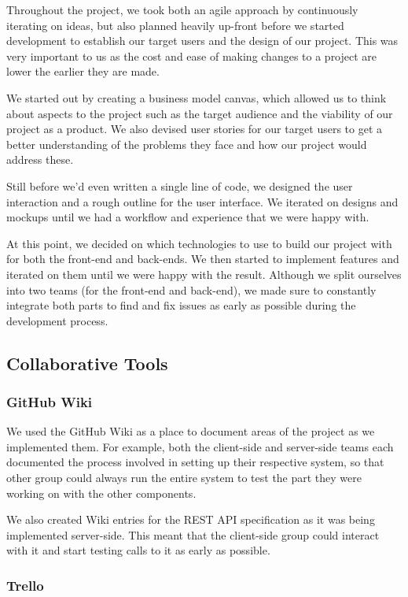 \documentclass[11pt]{article}
\begin{document}
Throughout the project, we took both an agile approach by continuously iterating on ideas, but also planned heavily up-front before we started development to establish our target users and the design of our project. This was very important to us as the cost and ease of making changes to a project are lower the earlier they are made.

We started out by creating a business model canvas, which allowed us to think about aspects to the project such as the target audience and the viability of our project as a product. We also devised user stories for our target users to get a better understanding of the problems they face and how our project would address these.

Still before we'd even written a single line of code, we designed the user interaction and a rough outline for the user interface. We iterated on designs and mockups until we had a workflow and experience that we were happy with.

At this point, we decided on which technologies to use to build our project with for both the front-end and back-ends. We then started to implement features and iterated on them until we were happy with the result. Although we split ourselves into two teams (for the front-end and back-end), we made sure to constantly integrate both parts to find and fix issues as early as possible during the development process.

\subsection {Collaborative Tools}
\subsubsection {GitHub Wiki}
We used the GitHub Wiki as a place to document areas of the project as we implemented them. For example, both the client-side and server-side teams each documented the process involved in setting up their respective system, so that other group could always run the entire system to test the part they were working on with the other components.

We also created Wiki entries for the REST API specification as it was being implemented server-side. This meant that the client-side group could interact with it and start testing calls to it as early as possible.
\subsubsection {Trello}
\end{document}
